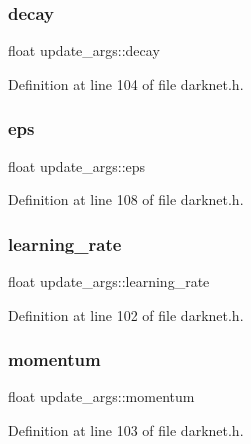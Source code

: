 \subsubsection{\texorpdfstring{decay}{decay}}
{\footnotesize\ttfamily float update\+\_\+args\+::decay}



Definition at line 104 of file darknet.\+h.

\mbox{\label{structupdate__args_a7a173936c93e7424d77347cfa9ab3f2f}} 
\subsubsection{\texorpdfstring{eps}{eps}}
{\footnotesize\ttfamily float update\+\_\+args\+::eps}



Definition at line 108 of file darknet.\+h.

\mbox{\label{structupdate__args_a3a0145d580360b2ffae2879af7e68c67}} 
\subsubsection{\texorpdfstring{learning\_rate}{learning\_rate}}
{\footnotesize\ttfamily float update\+\_\+args\+::learning\+\_\+rate}



Definition at line 102 of file darknet.\+h.

\mbox{\label{structupdate__args_abc35ad880888473f137cb9744e874870}} 
\subsubsection{\texorpdfstring{momentum}{momentum}}
{\footnotesize\ttfamily float update\+\_\+args\+::momentum}



Definition at line 103 of file darknet.\+h.

\mbox{\label{structupdate__args_addc09d90e7323fc19a4e04b0612ef10b}} 
